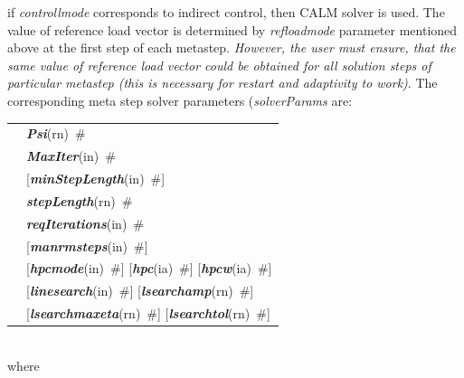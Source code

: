 \documentclass[a4paper]{article}
\makeatletter
\newcommand{\param}[1]{{\em #1}}
\newcommand{\keywordnotype}[1]{\mbox{{\it{\bf{#1}}}}}
\newcommand{\keyword}[2]{\mbox{{\keywordnotype{#1}\tiny (#2)}}}
\newcommand{\field}[2]{\mbox{\keyword{#1}{#2}~\#}}
\newcommand{\optField}[2]{\mbox{[\field{#1}{#2}]}}
\newenvironment{record}[1][]{\begin{tabular}{|ll}}{\end{tabular}\\}
\newcommand{\recentry}[2]{{#1}&{#2}\\}
\newcounter{rcc}
\newenvironment{record}[1][\textwidth]{\setcounter{rcc}{0}\begin{tabular*}{#1}{|ll@{\extracolsep{\fill}}r}}{\end{tabular*}\\}
\newcommand{\recentry}[2]{\ifthenelse{\value{rcc}>0}{&$\backslash$ \\}{\setcounter{rcc}{1}}{#1}&{#2}}
\makeatother
\begin{document}
if \param{controllmode} corresponds to indirect control, then CALM
solver is used. The value of reference load vector is determined by
\param{refloadmode} parameter mentioned above at the first step of
each metastep. {\em However, the user must ensure, that the same value of
reference load vector could be obtained for all solution steps of
particular metastep (this is necessary for restart and adaptivity to work)}.
The corresponding meta step solver parameters (\param{solverParams} are:\\
\begin{record}
\recentry{\hspace{10mm}}{\field{Psi}{rn}}
\recentry{}{\field{MaxIter}{in}}
\recentry{}{\optField{min\-Step\-Le\-ngth}{in}}
\recentry{}{\field{stepLength}{rn}} \recentry{}{\field{reqIterations}{in}}
\recentry{}{\optField{manrmsteps}{in}} 
\recentry{}{\optField{hpcmode}{in} \optField{hpc}{ia} \optField{hpcw}{ia}}
\recentry{}{\optField{linesearch}{in} \optField{lsearchamp}{rn}}
\recentry{}{\optField{lsearchmaxeta}{rn} \optField{lsearchtol}{rn}}
\end{record}
where
\end{document}
